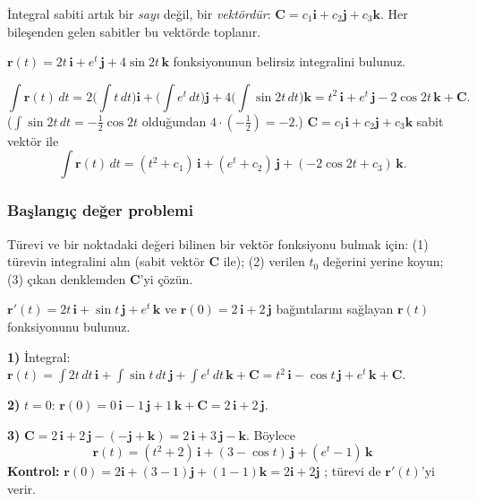  İntegral sabiti artık bir \emph{sayı} değil, bir \emph{vektördür}: $\mathbf C=c_1\mathbf i+c_2\mathbf j+c_3\mathbf k$.
Her bileşenden gelen sabitler bu vektörde toplanır.

\begin{soru}
$\mathbf r(t)=2t\,\mathbf i+e^t\,\mathbf j+4\sin2t\,\mathbf k$ fonksiyonunun belirsiz integralini bulunuz.
\end{soru}
\begin{cevap}
\[ \int\mathbf r(t)\,dt=2\Big(\int t\,dt\Big)\mathbf i+\Big(\int e^t\,dt\Big)\mathbf j+4\Big(\int\sin2t\,dt\Big)\mathbf k
=t^2\,\mathbf i+e^t\,\mathbf j-2\cos2t\,\mathbf k+\mathbf C . \]
($\int\sin2t\,dt=-\frac12\cos2t$ olduğundan $4\cdot(-\frac12)=-2$.) $\mathbf C=c_1\mathbf i+c_2\mathbf j+c_3\mathbf k$ sabit vektör ile
\[ \int\mathbf r(t)\,dt=(t^2+c_1)\,\mathbf i+(e^t+c_2)\,\mathbf j+(-2\cos2t+c_3)\,\mathbf k . \]
\end{cevap}

\subsubsection{Başlangıç değer problemi}

Türevi ve bir noktadaki değeri bilinen bir vektör fonksiyonu bulmak için: (1) türevin integralini alın (sabit vektör $\mathbf C$ ile);
(2) verilen $t_0$ değerini yerine koyun; (3) çıkan denklemden $\mathbf C$'yi çözün.

\begin{soru}
$\mathbf r'(t)=2t\,\mathbf i+\sin t\,\mathbf j+e^t\,\mathbf k$ ve $\mathbf r(0)=2\,\mathbf i+2\,\mathbf j$ bağıntılarını sağlayan $\mathbf r(t)$ fonksiyonunu bulunuz.
\end{soru}
\begin{cevap}
\textbf{1)} İntegral: $\mathbf r(t)=\int2t\,dt\,\mathbf i+\int\sin t\,dt\,\mathbf j+\int e^t\,dt\,\mathbf k+\mathbf C=t^2\,\mathbf i-\cos t\,\mathbf j+e^t\,\mathbf k+\mathbf C$.

\textbf{2)} $t=0$: $\mathbf r(0)=0\,\mathbf i-1\,\mathbf j+1\,\mathbf k+\mathbf C=2\,\mathbf i+2\,\mathbf j$.

\textbf{3)} $\mathbf C=2\,\mathbf i+2\,\mathbf j-(-\mathbf j+\mathbf k)=2\,\mathbf i+3\,\mathbf j-\mathbf k$. Böylece
\[ \boxed{\mathbf r(t)=(t^2+2)\,\mathbf i+(3-\cos t)\,\mathbf j+(e^t-1)\,\mathbf k} \]
\textbf{Kontrol:} $\mathbf r(0)=2\mathbf i+(3-1)\mathbf j+(1-1)\mathbf k=2\mathbf i+2\mathbf j$ \checkmark; türevi de $\mathbf r'(t)$'yi verir.
\end{cevap}


